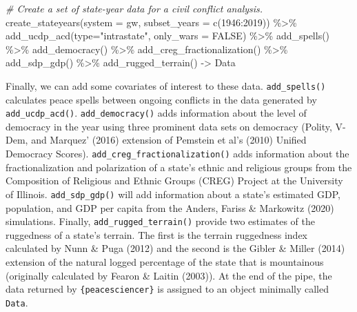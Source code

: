 \documentclass[
  11pt,
]{article}
\newenvironment{Shaded}{\begin{snugshade}}{\end{snugshade}}
\newcommand{\AttributeTok}[1]{\textcolor[rgb]{0.77,0.63,0.00}{#1}}
\newcommand{\CommentTok}[1]{\textcolor[rgb]{0.56,0.35,0.01}{\textit{#1}}}
\newcommand{\ConstantTok}[1]{\textcolor[rgb]{0.00,0.00,0.00}{#1}}
\newcommand{\DecValTok}[1]{\textcolor[rgb]{0.00,0.00,0.81}{#1}}
\newcommand{\FunctionTok}[1]{\textcolor[rgb]{0.00,0.00,0.00}{#1}}
\newcommand{\NormalTok}[1]{#1}
\newcommand{\OtherTok}[1]{\textcolor[rgb]{0.56,0.35,0.01}{#1}}
\newcommand{\SpecialCharTok}[1]{\textcolor[rgb]{0.00,0.00,0.00}{#1}}
\newcommand{\StringTok}[1]{\textcolor[rgb]{0.31,0.60,0.02}{#1}}
\begin{document}
\begin{Shaded}
\begin{Highlighting}[]
\CommentTok{\# Create a set of state{-}year data for a civil conflict analysis.}
\FunctionTok{create\_stateyears}\NormalTok{(}\AttributeTok{system =} \StringTok{\textquotesingle{}gw\textquotesingle{}}\NormalTok{, }\AttributeTok{subset\_years =} \FunctionTok{c}\NormalTok{(}\DecValTok{1946}\SpecialCharTok{:}\DecValTok{2019}\NormalTok{)) }\SpecialCharTok{\%\textgreater{}\%}
  \FunctionTok{add\_ucdp\_acd}\NormalTok{(}\AttributeTok{type=}\StringTok{"intrastate"}\NormalTok{, }\AttributeTok{only\_wars =} \ConstantTok{FALSE}\NormalTok{) }\SpecialCharTok{\%\textgreater{}\%}
  \FunctionTok{add\_spells}\NormalTok{() }\SpecialCharTok{\%\textgreater{}\%}
  \FunctionTok{add\_democracy}\NormalTok{() }\SpecialCharTok{\%\textgreater{}\%}
  \FunctionTok{add\_creg\_fractionalization}\NormalTok{() }\SpecialCharTok{\%\textgreater{}\%}
  \FunctionTok{add\_sdp\_gdp}\NormalTok{() }\SpecialCharTok{\%\textgreater{}\%}
  \FunctionTok{add\_rugged\_terrain}\NormalTok{() }\OtherTok{{-}\textgreater{}}\NormalTok{ Data}
\end{Highlighting}
\end{Shaded}

Finally, we can add some covariates of interest to these data. \texttt{add\_spells()} calculates peace spells between ongoing conflicts in the data generated by \texttt{add\_ucdp\_acd()}. \texttt{add\_democracy()} adds information about the level of democracy in the year using three prominent data sets on democracy (Polity, V-Dem, and Marquez' (2016) extension of Pemstein et al's (2010) Unified Democracy Scores). \texttt{add\_creg\_fractionalization()} adds information about the fractionalization and polarization of a state's ethnic and religious groups from the Composition of Religious and Ethnic Groups (CREG) Project at the University of Illinois. \texttt{add\_sdp\_gdp()} will add information about a state's estimated GDP, population, and GDP per capita from the Anders, Fariss \& Markowitz (2020) simulations. Finally, \texttt{add\_rugged\_terrain()} provide two estimates of the ruggedness of a state's terrain. The first is the terrain ruggedness index calculated by Nunn \& Puga (2012) and the second is the Gibler \& Miller (2014) extension of the natural logged percentage of the state that is mountainous (originally calculated by Fearon \& Laitin (2003)). At the end of the pipe, the data returned by \texttt{\{peacesciencer\}} is assigned to an object minimally called \texttt{Data}.
\end{document}
